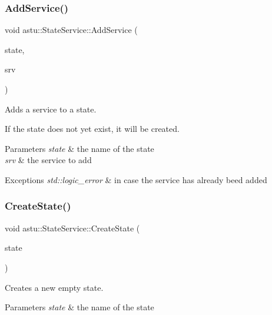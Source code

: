 \subsubsection{\texorpdfstring{Add\+Service()}{AddService()}}
{\footnotesize\ttfamily void astu\+::\+State\+Service\+::\+Add\+Service (\begin{DoxyParamCaption}\item[{const std\+::string \&}]{state,  }\item[{std\+::shared\+\_\+ptr$<$ \hyperlink{classastu_1_1IService}{I\+Service} $>$}]{srv }\end{DoxyParamCaption})}

Adds a service to a state.

If the state does not yet exist, it will be created.


\begin{DoxyParams}{Parameters}
{\em state} & the name of the state \\
\hline
{\em srv} & the service to add \\
\hline
\end{DoxyParams}

\begin{DoxyExceptions}{Exceptions}
{\em std\+::logic\+\_\+error} & in case the service has already beed added \\
\hline
\end{DoxyExceptions}
\mbox{\label{classastu_1_1StateService_ae1916f97f8f386b6f4ac42d58c0ae97f}} 
\subsubsection{\texorpdfstring{Create\+State()}{CreateState()}}
{\footnotesize\ttfamily void astu\+::\+State\+Service\+::\+Create\+State (\begin{DoxyParamCaption}\item[{const std\+::string \&}]{state }\end{DoxyParamCaption})}

Creates a new empty state.


\begin{DoxyParams}{Parameters}
{\em state} & the name of the state \\
\hline
\end{DoxyParams}

